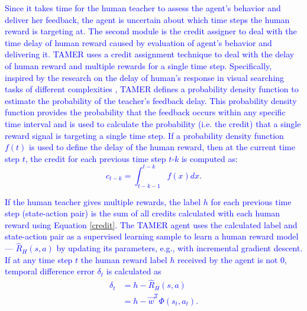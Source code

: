 \textcolor{blue}{Since it takes time for the human teacher to assess the agent's behavior and deliver her feedback, the agent is uncertain about which time steps the human reward is targeting at. The second module is the credit assigner to deal with the time delay of human reward caused by evaluation of agent's behavior and delivering it. TAMER uses a credit assignment technique to deal with the delay of human reward and multiple rewards for a single time step. Specifically, inspired by the research on the delay of human's response in visual searching tasks of different complexities \cite{hockley1984analysis}, TAMER defines a probability density function to estimate the probability of the teacher's feedback delay. This probability density function provides the probability that the feedback occurs within any specific time interval and is used to calculate the probability (i.e. the credit) that a single reward signal is targeting a single time step. If a probability density function $f(t)$ is used to define the delay of the human reward, then at the current time step $t$, the credit for each previous time step $t$-$k$ is computed as:
\begin{equation}
c_{t-k} = \int_{t-k-1}^{t-k} f(x) dx.
\label{credit}
\end{equation}
}

\textcolor{blue}{If the human teacher gives multiple rewards, the label $h$ for each previous time step (state-action pair) is the sum of all credits calculated with each human reward using Equation \ref{credit}. %
The TAMER agent uses the calculated label and state-action pair as a supervised learning sample to learn a human reward model --- $\hat{R}_{H}(s, a)$ by updating its parameters, e.g., with incremental gradient descent. If at any time step $t$ the human reward label $h$ received by the agent is not 0, temporal difference error $\delta_{t} $ is calculated as
\begin{equation}
\begin{aligned}
\delta_{t} &= h - \hat{R}_{H}(s, a) \\
&= h - \vec{w}^{\mathrm{T}}\Phi(s_{t},a_{t}).
\end{aligned}
\label{herror}
\end{equation}
}

